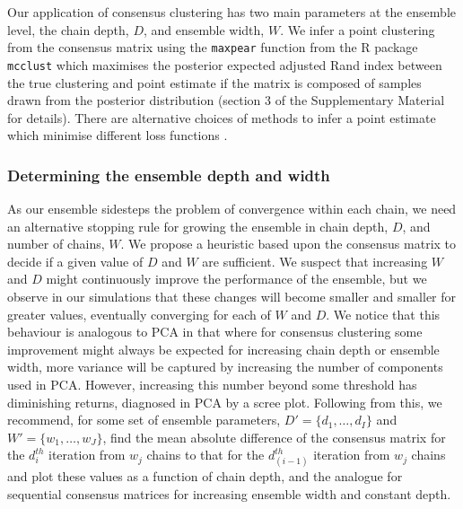 \documentclass{bmcart}
\begin{document}
Our application of consensus clustering has two main parameters at the ensemble level, the chain depth, $D$, and ensemble width, $W$. We infer a point clustering from the consensus matrix using the \texttt{maxpear} function \citep{fritsch2009improved} from the R package \texttt{mcclust} \citep{fritsch2012mcclust} which maximises the posterior expected adjusted Rand index between the true clustering and point estimate if the matrix is composed of samples drawn from the posterior distribution (section 3 of the Supplementary Material for details). There are alternative choices of methods to infer a point estimate which minimise different loss functions \citep[see, e.g.,][]{WadeBayesianClusterAnalysis2018, LourencoProbabilisticconsensusclustering2015, DahlSearchAlgorithmsLoss2021}.

\subsubsection*{Determining the ensemble depth and width} \label{sec:ensembleChoice}
As our ensemble sidesteps the problem of convergence within each chain, we need an alternative stopping rule for growing the ensemble in chain depth, $D$, and number of chains, $W$. We propose a heuristic based upon the consensus matrix to decide if a given value of $D$ and $W$ are sufficient. We suspect that increasing $W$ and $D$ might continuously improve the performance of the ensemble, but we observe in our simulations that these changes will become smaller and smaller for greater values, eventually converging for each of $W$ and $D$. We notice that this behaviour is analogous to PCA in that where for consensus clustering some improvement might always be expected for increasing chain depth or ensemble width, more variance will be captured by increasing the number of components used in PCA. However, increasing this number beyond some threshold has diminishing returns, diagnosed in PCA by a scree plot. Following from this, we recommend, for some set of ensemble parameters, $D' = \{d_1, \ldots, d_I\}$ and $W'=\{w_1, \ldots, w_J\}$, find the mean absolute difference of the consensus matrix for the $d_i^{th}$ iteration from $w_j$ chains to that for the $d_{(i-1)}^{th}$ iteration from $w_j$ chains and plot these values as a function of chain depth, and the analogue for sequential consensus matrices for increasing ensemble width and constant depth.
\end{document}
